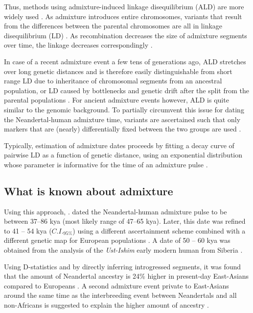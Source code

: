 \documentclass[]{article}
\begin{document}
Thus, methods using admixture-induced linkage disequilibrium (ALD) are more widely used \citep{moorjani_history_2011,sankararaman_date_2012,sankararaman_combined_2016}. As admixture introduces entire chromosomes, variants that result from the differences between the parental chromosomes are all in linkage disequilibrium (LD) \citep{chakraborty_admixture_1988,stephens_mapping_1994,wall_detecting_2000}. As recombination decreases the size of admixture segments over time, the linkage decreases correspondingly \citep{patterson_methods_2004}. 

In case of a recent admixture event a few tens of generations ago, ALD stretches  over long genetic distances and is therefore easily distinguishable from short range LD due to inheritance of chromosomal segments from an ancestral population, or LD caused by bottlenecks and genetic drift after the split from the parental populations \citep{moorjani_history_2011}. For ancient admixture events however, ALD is quite similar to the genomic background. To partially circumvent this issue for dating the Neandertal-human admixture time, variants are ascertained such that only  markers that are (nearly) differentially fixed between the two groups are used 
\citep{sankararaman_date_2012}. 

Typically, estimation of admixture dates proceeds by fitting a decay curve of pairwise LD as a function of genetic distance, using an exponential distribution whose parameter is informative for the time of an admixture pulse \citep{moorjani_history_2011,loh_inferring_2013}. 



\subsection{What is known about admixture}

Using this approach,   \cite{sankararaman_date_2012}. dated the Neandertal-human admixture pulse to be  between 37--86 kya (most likely range of 47–65 kya). Later, this date was refined to 41 -- 54 kya ($C.I._{95\%}$) using a different ascertainment scheme combined with a different genetic map for European populations \citep{moorjani_genetic_2016}. A date of 50 -- 60 kya was obtained from the analysis of the \textit{Ust-Ishim} early modern human from Siberia \citep{fu_genome_2014}.

Using D-statistics \citep{green_draft_2010} and by directly inferring introgressed segments, it was found that the amount of Neandertal ancestry is 24\% higher in present-day East-Asians compared to Europeans \citep{meyer_high-coverage_2012,  wall_higher_2013}. A second admixture event private to East-Asians around the same time as the interbreeding event between Neandertals and all non-Africans is suggested to explain the higher amount of ancestry \citep{kim_selection_2015,vernot_complex_2015}.
\end{document}
